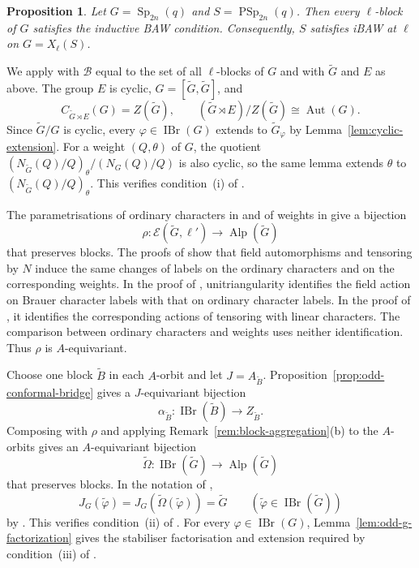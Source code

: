\documentclass[10pt]{amsart}
\newtheorem{proposition}[theorem]{Proposition}
\theoremstyle{definition}
\let\oldendproof\endproof
\renewenvironment{proof}[1][\proofname]{%
  \oldproof[\bfseries #1]%
}{\oldendproof}
\DeclareMathOperator{\Aut}{Aut}
\DeclareMathOperator{\IBr}{IBr}
\DeclareMathOperator{\Alp}{Alp}
\DeclareMathOperator{\Sp}{Sp}
\DeclareMathOperator{\PSp}{PSp}
\numberwithin{equation}{section}
\numberwithin{table}{section}
\begin{document}
\begin{proposition}
\label{prop:odd-conlon}
Let $G=\Sp_{2n}(q)$ and $S=\PSp_{2n}(q)$.
Then every $\ell$-block of $G$ satisfies the inductive BAW condition.
Consequently, $S$ satisfies iBAW at $\ell$ on $G=X_\ell(S)$.
\end{proposition}

\begin{proof}
We apply \cite[Theorem~4.5]{BroughSpath2022} with $\mathcal B$ equal to
the set of all $\ell$-blocks of $G$ and with $\widetilde G$ and $E$ as
above.  The group $E$ is cyclic, $G=[\widetilde G,\widetilde G]$, and
\[
 C_{\widetilde G\rtimes E}(G)=Z(\widetilde G),
 \qquad
 (\widetilde G\rtimes E)/Z(\widetilde G)\cong\Aut(G).
\]
Since $\widetilde G/G$ is cyclic, every
$\varphi\in\IBr(G)$ extends to $\widetilde G_\varphi$ by
Lemma~\ref{lem:cyclic-extension}.
For a weight $(Q,\theta)$ of $G$, the quotient
$(N_{\widetilde G}(Q)/Q)_\theta/(N_G(Q)/Q)$ is also cyclic,
so the same lemma extends $\theta$ to
$(N_{\widetilde G}(Q)/Q)_\theta$.
This verifies condition~\textup{(i)} of
\cite[Theorem~4.5]{BroughSpath2022}.

The parametrisations of ordinary characters in \cite[Lemma~3.13]{Li2021} and
of weights in \cite[Theorem~4.13 and Remarks~4.7--4.8]{Li2021} give a
bijection
\[
 \rho:\mathcal E(\widetilde G,\ell')
       \longrightarrow\Alp(\widetilde G)
\]
that preserves blocks.
The proofs of \cite[Lemmas~5.1 and~5.3]{Li2021} show that field
automorphisms and tensoring by $N$ induce the same changes of labels on
the ordinary characters and on the corresponding weights.
In the proof of \cite[Lemma~5.1]{Li2021},
unitriangularity identifies the field action on Brauer character labels
with that on ordinary character labels. In the proof of
\cite[Lemma~5.3]{Li2021}, it identifies the corresponding actions of
tensoring with linear characters. The comparison between ordinary
characters and weights uses neither identification. Thus $\rho$ is
$A$-equivariant.

Choose one block $\widetilde B$ in each $A$-orbit and let
$J=A_{\widetilde B}$.
Proposition~\ref{prop:odd-conformal-bridge} gives a $J$-equivariant
bijection
\[
 \alpha_{\widetilde B}:\IBr(\widetilde B)
       \longrightarrow Z_{\widetilde B}.
\]
Composing with $\rho$ and applying Remark~\ref{rem:block-aggregation}\textup{(b)}
to the $A$-orbits gives an
$A$-equivariant bijection
\[
 \widetilde\Omega:\IBr(\widetilde G)\longrightarrow\Alp(\widetilde G)
\]
that preserves blocks.
In the notation of \cite[Theorem~4.5(ii)]{BroughSpath2022},
\[
 J_G(\widetilde\varphi)
   =J_G(\widetilde\Omega(\widetilde\varphi))
   =\widetilde G
 \qquad(\widetilde\varphi\in\IBr(\widetilde G))
\]
by \cite[Remark~2.2(1)]{Li2021}.
This verifies condition~\textup{(ii)} of
\cite[Theorem~4.5]{BroughSpath2022}.
For every $\varphi\in\IBr(G)$,
Lemma~\ref{lem:odd-g-factorization} gives the stabiliser factorisation
and extension required by condition~\textup{(iii)} of
\cite[Theorem~4.5]{BroughSpath2022}.


\end{proof}
\end{document}

